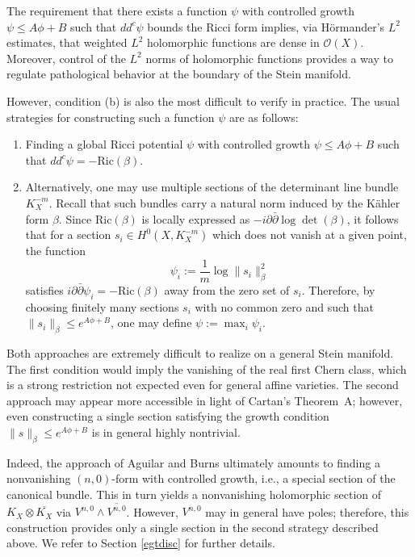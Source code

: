 \documentclass[a4paper, 12pt]{article}
\newcommand{\Ric}{\mathrm{Ric}}
\newcommand{\idd}{i\partial\bar\partial}
\begin{document}
The requirement that there exists a function $\psi$ with controlled growth $\psi \le A\phi + B$ such that $dd^c \psi$ bounds the Ricci form implies, via H\"ormander's $L^2$ estimates, that weighted $L^2$ holomorphic functions are dense in $\mathcal{O}(X)$. Moreover, control of the $L^2$ norms of holomorphic functions provides a way to regulate pathological behavior at the boundary of the Stein manifold.

However, condition (b) is also the most difficult to verify in practice. The usual strategies for constructing such a function $\psi$ are as follows:
\begin{enumerate}
\item Finding a global Ricci potential $\psi$ with controlled growth $\psi\le A\phi+B$ such that $dd^c \psi = -\Ric(\beta)$.
\item Alternatively, one may use multiple sections of the determinant line bundle $K_X^{-m}$. Recall that such bundles carry a natural norm induced by the Kähler form $\beta$. Since $\Ric(\beta)$ is locally expressed as $-\idd \log \det(\beta)$, it follows that for a section $s_i \in H^0(X,K_X^{-m})$ which does not vanish at a given point, the function
\[
\psi_i := \frac{1}{m}\log \|s_i\|_\beta^2
\]
satisfies $\idd \psi_i = -\Ric(\beta)$ away from the zero set of $s_i$. Therefore, by choosing finitely many sections $s_i$ with no common zero and such that $\|s_i\|_\beta \le e^{A\phi+B}$, one may define $\psi := \max_i \psi_i$.
\end{enumerate}

Both approaches are extremely difficult to realize on a general Stein manifold. The first condition would imply the vanishing of the real first Chern class, which is a strong restriction not expected even for general affine varieties. The second approach may appear more accessible in light of Cartan's Theorem~A; however, even constructing a single section satisfying the growth condition $\|s\|_\beta\le e^{A\phi+B}$ is in general highly nontrivial. 

Indeed, the approach of Aguilar and Burns ultimately amounts to finding a nonvanishing $(n,0)$-form with controlled growth, i.e., a special section of the canonical bundle. This in turn yields a nonvanishing holomorphic section of $K_X\otimes\overline{K_X}$ via $V^{n,0} \wedge \overline{V^{n,0}}$. However, $V^{n,0}$ may in general have poles; therefore, this construction provides only a single section in the second strategy described above. We refer to Section \ref{egtdisc} for further details.
\end{document}
